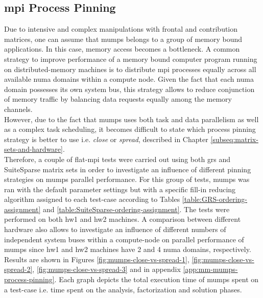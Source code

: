 \subsection{\acrshort{mpi} Process Pinning}
\label{subseq:mm-mumps-process-pinning}

Due to intensive and complex manipulations with frontal and contribution matrices, one can assume that \acrshort{mumps} belongs to a group of memory bound applications. In this case, memory access becomes a bottleneck. A common strategy to improve performance of a memory bound computer program running on distributed-memory machines is to distribute \acrshort{mpi} processes equally across all available \acrshort{numa} domains within a compute node. Given the fact that each \acrshort{numa} domain possesses its own system bus, this strategy allows to reduce conjunction of memory traffic by balancing data requests equally among the memory channels.\\


However, due to the fact that \acrshort{mumps} uses both task and data parallelism as well as a complex task scheduling, it becomes difficult to state which process pinning strategy is better to use i.e. \textit{close} or \textit{spread}, described in Chapter \ref{subseq:matrix-sets-and-hardware}.\\


Therefore, a couple of flat-\acrshort{mpi} tests were carried out using both \acrshort{grs} and SuiteSparse matrix sets in order to investigate an influence of different pinning strategies on \acrshort{mumps} parallel performance. For this group of tests, \acrshort{mumps} was ran with the default parameter settings but with a specific fill-in reducing algorithm assigned to each test-case according to Tables \ref{table:GRS-ordering-assignment} and \ref{table:SuiteSparse-ordering-assignment}. The tests were performed on both \gls{hw1} and \gls{hw2} machines. A comparison between different hardware also allows to investigate an influence of different numbers of independent system buses within a compute-node on parallel performance of \acrshort{mumps} since \gls{hw1} and \gls{hw2} machines have 2 and 4 \acrshort{numa} domains, respectively. Results are shown in Figures \ref{fig:mumps-close-vs-spread-1}, \ref{fig:mumps-close-vs-spread-2}, \ref{fig:mumps-close-vs-spread-3} and in appendix \ref{app:mm-mumps-process-pinning}. Each graph depicts the total execution time of \acrshort{mumps} spent on a test-case i.e. time spent on the analysis, factorization and solution phases.\\


